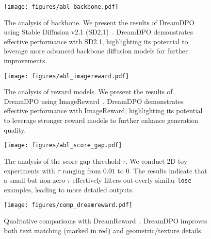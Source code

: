 \begin{figure}[t]
  \centering
  \begin{minipage}{0.5\textwidth}
    \centering
    \texttt{[image: figures/abl\_backbone.pdf]}
    \caption{The analysis of backbone.
    We present the results of DreamDPO using Stable Diffusion v2.1 (SD2.1)~\citep{rombach2022high}.
    DreamDPO demonstrates effective performance with SD2.1, highlighting its potential to leverage more advanced backbone diffusion models for further improvements.}
    \label{fig:abl_backbone}
  \end{minipage}\hfill
  \begin{minipage}{0.48\textwidth}
    \centering
    \texttt{[image: figures/abl\_imagereward.pdf]}
    \caption{The analysis of reward models.
    We present the results of DreamDPO using ImageReward~\citep{xu2024imagereward}.
    DreamDPO demonstrates effective performance with ImageReward, highlighting its potential to leverage stronger reward models to further enhance generation quality.}
    \label{fig:abl_imagereward}
  \end{minipage}
\end{figure}


\begin{figure}[t]
    \centering    
    \texttt{[image: figures/abl\_score\_gap.pdf]}     
    \caption{
    The analysis of the score gap threshold $\tau$.     
    We conduct 2D toy experiments with $\tau$ ranging from $0.01$ to $0$.
    The results indicate that a small but non-zero $\tau$ effectively filters out overly similar \texttt{lose} examples, leading to more detailed outputs.
    }   
    \label{fig:abl_score_gap} 
\end{figure}



\begin{figure*}[t]
    \centering
    \texttt{[image: figures/comp\_dreamreward.pdf]}
    \caption{
    Qualitative comparisons with DreamReward~\citep{ye2025dreamreward}.
    DreamDPO improves both text matching (marked in red) and geometric/texture details.
    }
    \label{fig:quan_comp_baseline}
\end{figure*}



